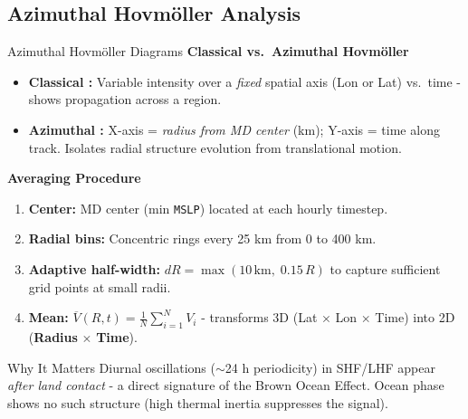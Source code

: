 \documentclass[10pt, aspectratio=169,t,xcolor=table]{beamer}
\begin{document}
\subsection{Azimuthal Hovm\"oller Analysis}
\begin{frame}{Azimuthal Hovm\"oller Diagrams}
	\textbf{\small Classical vs.\ Azimuthal Hovm\"oller}
	\footnotesize
	\begin{itemize}
		\item \textbf{Classical :} Variable intensity over a \textit{fixed} spatial
		      axis (Lon or Lat) vs.\ time - shows propagation across a region.
		\item \textbf{Azimuthal :} X-axis = \textit{radius from MD center}
		      (km); Y-axis = time along track.
		      Isolates radial structure evolution from translational motion.
	\end{itemize}

	\vspace{0.3cm}
	\textbf{\small Averaging Procedure}
	\footnotesize
	\begin{enumerate}
		\item \textbf{Center:} MD center (min \texttt{MSLP}) located at each hourly timestep.
		\item \textbf{Radial bins:} Concentric rings every 25 km from 0 to 400 km.
		\item \textbf{Adaptive half-width:} $dR = \max(10\,\text{km},\; 0.15\,R)$ to capture sufficient grid points at small radii.
		\item \textbf{Mean:} $\overline{V}(R,t) = \frac{1}{N}\sum_{i=1}^{N} V_i$ - transforms 3D (Lat $\times$ Lon $\times$ Time) into 2D (\textbf{Radius} $\times$ \textbf{Time}).
	\end{enumerate}

	\begin{alertblock}{\small Why It Matters}
		\footnotesize
		Diurnal oscillations ($\sim$24 h periodicity) in SHF/LHF appear \textit{after land contact} - a direct signature of the
		Brown Ocean Effect.  Ocean phase shows no such structure (high thermal inertia suppresses the signal).
	\end{alertblock}
\end{frame}
\end{document}
